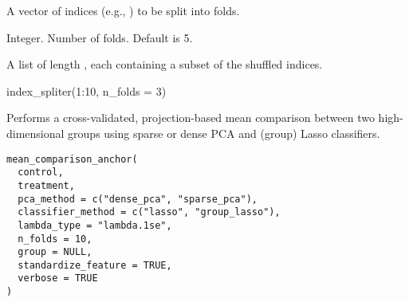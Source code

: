 \documentclass[a4paper]{book}
\begin{document}
%
\begin{Arguments}
\begin{ldescription}
\item[\code{array}] A vector of indices (e.g., ) to be split into folds.

\item[\code{n\_folds}] Integer. Number of folds. Default is 5.
\end{ldescription}
\end{Arguments}
%
\begin{Value}
A list of length , each containing a subset of the shuffled indices.
\end{Value}
%
\begin{Examples}
\begin{ExampleCode}
index_spliter(1:10, n_folds = 3)

\end{ExampleCode}
\end{Examples}
%
\begin{Description}
Performs a cross-validated, projection-based mean comparison between two high-dimensional groups using sparse or dense PCA and (group) Lasso classifiers.
\end{Description}
%
\begin{Usage}
\begin{verbatim}
mean_comparison_anchor(
  control,
  treatment,
  pca_method = c("dense_pca", "sparse_pca"),
  classifier_method = c("lasso", "group_lasso"),
  lambda_type = "lambda.1se",
  n_folds = 10,
  group = NULL,
  standardize_feature = TRUE,
  verbose = TRUE
)
\end{verbatim}
\end{Usage}
%
\end{document}
